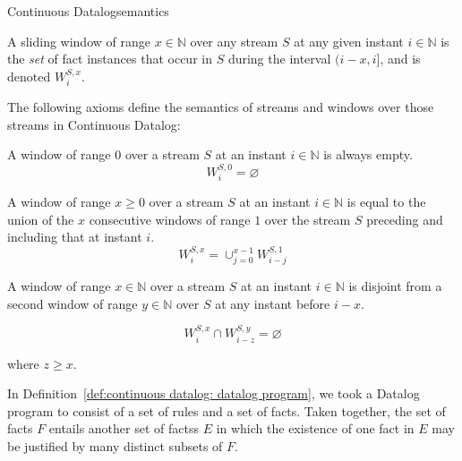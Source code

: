 \begin{nestedsection}{Continuous Datalog}{semantics}
\begin{definition}
\label{def:continuous datalog: window}
A sliding window of range ${x \in \mathbb{N}}$ over any stream $S$ at
any given instant ${i \in \mathbb{N}}$ is the \emph{set} of fact
instances that occur in $S$ during the interval ${(i-x,i]}$, and is
  denoted ${W^{S,x}_{i}}$.
\end{definition}

The following axioms define the semantics of streams and windows over
those streams in Continuous Datalog:

\begin{axiom}\label{axiom:continuous datalog: window range leq 0}
A window of range $0$ over a stream $S$ at an instant 
${i \in \mathbb{N}}$ is always empty.
\begin{equation*}
W^{S,0}_{i} = \varnothing
\end{equation*}
\end{axiom}

\begin{axiom}\label{axiom:continuous datalog: window composition}
A window of range ${x \ge 0}$ over a stream $S$ at an instant 
${i \in \mathbb{N}}$ is equal to the union of the $x$ consecutive
windows of range $1$ over the stream $S$ preceding and including that at
instant $i$.
\begin{equation*}
W^{S,x}_{i} = \mathop{\cup}_{j=0}^{x-1} W^{S,1}_{i-j}
\end{equation*}
\end{axiom}

\begin{axiom}\label{axiom:continuous datalog: window disjointness}
A window of range ${x \in \mathbb{N}}$ over a stream $S$ at an
instant ${i \in \mathbb{N}}$ is disjoint from a second window of 
range ${y \in \mathbb{N}}$ over $S$ at any instant before $i - x$.

\begin{equation*}
W^{S,x}_{i} \cap W^{S,y}_{i-z} = \varnothing
\end{equation*}

\noindent where $z \geq x$.
\end{axiom}

In Definition~\ref{def:continuous datalog: datalog program}, we took a
Datalog program to consist of a set of rules and a set of facts.
Taken together, the set of facts $F$ entails another set of factss $E$
in which the existence of one fact in $E$ may be justified by many
distinct subsets of $F$.


\end{nestedsection}
